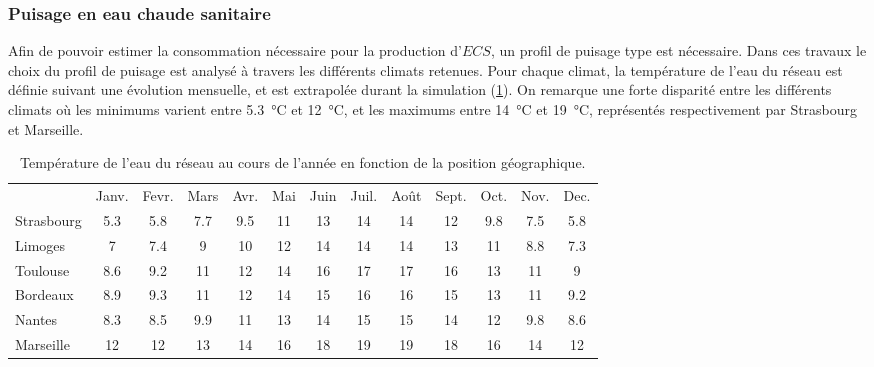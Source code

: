 \subsubsection{Puisage en eau chaude sanitaire} %
\label{ssub:puisage_en_eau_chaude_sanitaire}

Afin de pouvoir estimer la consommation nécessaire pour la production d’$ECS$, un profil
de puisage type est nécessaire. Dans ces travaux le choix du profil de puisage est analysé
à travers les différents climats retenues. Pour chaque climat, la température de l’eau du
réseau est définie suivant une évolution mensuelle, et est extrapolée durant la simulation
(\ref{tab:temp_eau}). On remarque une forte disparité entre les différents climats où les
minimums varient entre \SI{5.3}{\celsius} et
\SI{12}{\celsius}, et les maximums entre \SI{14}{\celsius} et \SI{19}{\celsius},
représentés respectivement par Strasbourg et Marseille.
\begin{table}
\centering
\caption{Température de l'eau du réseau au cours de l'année en fonction de la
         position géographique.}
\label{tab:temp_eau}
\begin{tabular}{l*{12}{c}}
    \toprule
               & Janv. & Fevr. & Mars & Avr. & Mai & Juin & Juil. & Août & Sept. & Oct. & Nov. & Dec. \\
    \cmidrule[\lightrulewidth](){2-13}
    Strasbourg & \num{5.3}   & \num{5.8}   & \num{7.7}  & \num{9.5}  & \num{11}  & \num{13}   & \num{14}    & \num{14}   & \num{12}    & \num{9.8}  & \num{7.5}  & \num{5.8}  \\
    Limoges    & \num{7}     & \num{7.4}   & \num{9}    & \num{10}   & \num{12}  & \num{14}   & \num{14}    & \num{14}   & \num{13}    & \num{11}   & \num{8.8}  & \num{7.3}  \\
    Toulouse   & \num{8.6}   & \num{9.2}   & \num{11}   & \num{12}   & \num{14}  & \num{16}   & \num{17}    & \num{17}   & \num{16}    & \num{13}   & \num{11}   & \num{9}    \\
    Bordeaux   & \num{8.9}   & \num{9.3}   & \num{11}   & \num{12}   & \num{14}  & \num{15}   & \num{16}    & \num{16}   & \num{15}    & \num{13}   & \num{11}   & \num{9.2}  \\
    Nantes     & \num{8.3}   & \num{8.5}   & \num{9.9}  & \num{11}   & \num{13}  & \num{14}   & \num{15}    & \num{15}   & \num{14}    & \num{12}   & \num{9.8}  & \num{8.6}  \\
    Marseille  & \num{12}    & \num{12}    & \num{13}   & \num{14}   & \num{16}  & \num{18}   & \num{19}    & \num{19}   & \num{18}    & \num{16}   & \num{14}   & \num{12}   \\
    \bottomrule
\end{tabular}
\end{table}


